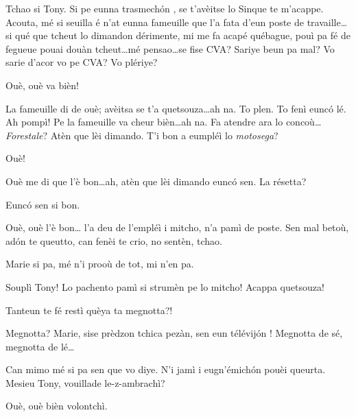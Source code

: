 \begin{drama}

\Turispeaks{} Tchao si Tony. Si pe eunna trasmech\'on , se t'avèitse lo Sinque te m'acappe. Acouta, mé si seuilla é n'at eunna fameuille que l'a fata d'eun poste de travaille\ldots si qué que tcheut lo dimandon dérimente, mi me fa acapé québague, pouì pa fé de fegueue pouai douàn tcheut\ldots mé pensao\ldots se fise CVA? Sariye beun pa mal?  Vo sarie d'acor vo pe CVA? Vo plériye?


\Tanteunspeaks Ouè, ouè va bièn!

\Turispeaks{} La fameuille di de ouè; avèitsa se t'a quetsouza\ldots ah na. To plen. To fenì eunc\'o lé. Ah pompì! Pe la fameuille va cheur bièn\ldots ah na. Fa atendre ara lo concoù\ldots \textit{Forestale}? Atèn que lèi dimando.  T'i bon a eumpléì lo \textit{motosega}?

\Twitterspeaks{} Ouè!

\Turispeaks{} Ouè me di que l'è bon\ldots ah, atèn que lèi dimando eunc\'o sen.  La résetta?

\Twitterspeaks{} Eunc\'o sen si bon.

\Turispeaks{} Ouè, ouè l'è bon\ldots {} l'a deu de l'empléì i mitcho, n'a pamì de poste.  Sen mal betoù, ad\'on te queutto, can fenèi te crio, no sentèn, tchao.


\Turispeaks Marie si pa, mé n'i prooù de tot, mi n'en pa.

\Ipadspeaks Souplì Tony! Lo pachento pamì si strumèn pe lo mitcho! Acappa quetsouza!

\Alicespeaks{} Tanteun te fé restì quèya ta megnotta?!

\Turispeaks Megnotta? Marie, sise prèdzon tchica pezàn, sen eun télévij\'on ! Megnotta de sé, megnotta de lé\ldots


\Mariespeaks Can mimo mé si pa sen que vo diye. N'i jamì i eugn'émich\'on pouèi queurta. Mesieu Tony, vouillade le-z-ambrachì?

\Turispeaks Ouè, ouè bièn volontchì.


\end{drama}
